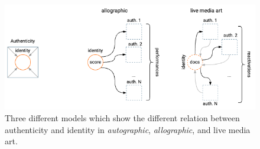 \begin{figure}[!h]
    \centering
    \includegraphics[width=\linewidth]{chapters/2-new_conservation_paradigms/image/graph02-identity.png}
    \caption{Three different models which show the different relation between authenticity and identity in \textit{autographic}, \textit{allographic}, and live media art.}
    \label{fig:c2-authenticity}
\end{figure}

